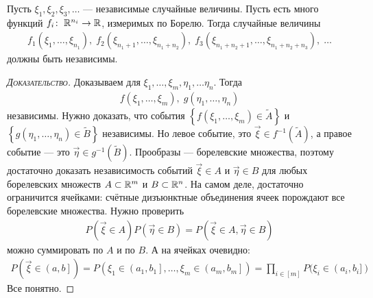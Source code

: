\documentclass[../main.tex]{subfiles}
\begin{document}
\begin{thm}
 Пусть $ \xi_1, \xi_2, \xi_3, \ldots $ --- независимые случайные величины. Пусть есть много функций $ f_i \colon\;\mathbb{R}^{n_i} \to \mathbb{R} $, измеримых по Борелю. Тогда случайные величины
 \begin{align*}
  f_1(\xi_1, \ldots, \xi_{n_1}),\; f_2(\xi_{n_1 + 1}, \ldots, \xi_{n_1 + n_2}),\; f_3(\xi_{n_1 + n_2 + 1}, \ldots, \xi_{n_1 + n_2 + n_3}),\; \ldots
 \end{align*} должны быть независимы.
\end{thm}
\begin{proof}[\normalfont\textsc{Доказательство}]
 Доказываем для $ \xi_1, \ldots, \xi_m, \eta_1, \ldots \eta_n $. Тогда
 \begin{align*}
  f(\xi_1, \ldots, \xi_m),\;g(\eta_1, \ldots, \eta_n)
\end{align*}  независимы. Нужно доказать, что события $ \left \{ f(\xi_1, \ldots,\xi_m) \in \tilde A \right \} $ и $ \left\{ g(\eta_1, \ldots, \eta_n) \in \tilde B \right\} $ независимы. Но левое событие, это $ \vec\xi \in f^{-1}(\tilde A) $, а правое событие --- это $ \vec\eta \in g^{-1}(\tilde B) $. Прообразы --- борелевские множества, поэтому достаточно доказать независимость событий $ \vec\xi \in A $ и $ \vec\eta \in B $ для любых борелевских множеств $ A \subset\mathbb{R}^{m} $ и $ B \subset \mathbb{R}^{n} $. На самом деле, достаточно ограничится ячейками: счётные дизъюнктные объединения ячеек порождают все борелевские множества. Нужно проверить
 \begin{align*}
  P(\vec\xi \in A) P(\vec\eta \in B) = P(\vec\xi \in A, \vec\eta \in B)
 \end{align*} можно суммировать по $ A $ и по $ B $. А на ячейках очевидно:
 \begin{align*}
	 P(\vec\xi \in \left(a, b\right]  ) = P(\xi_1 \in \left(a_1, b_1\right], \ldots, \xi_m \in \left(a_m, b_m\right]    ) = \prod_{i \in [m]}P(\xi_i \in (a_i, b_i])
 \end{align*} Все понятно.
\end{proof}
\end{document}

